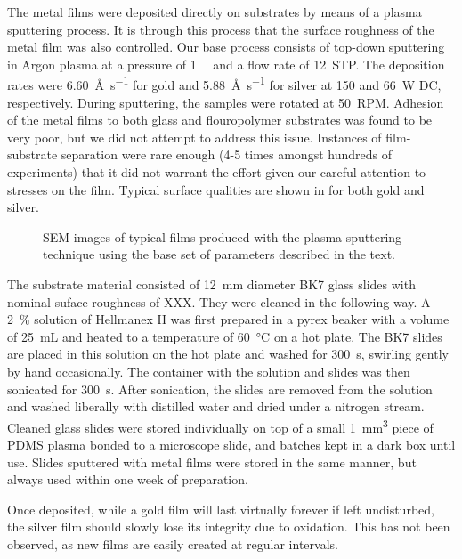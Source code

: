 The metal films were deposited directly on substrates by means of a plasma
sputtering process.  It is through this process that the surface roughness
of the metal film was also controlled.  Our base process consists of
top-down sputtering in Argon plasma at a pressure of \SI{1}{\milli\torr}
and a flow rate of \SI{12}{STP}.  The deposition rates were
\SI{6.60}{\angstrom\per\second} for gold and
\SI{5.88}{\angstrom\per\second} for silver at 150 and \SI{66}{\watt} DC,
respectively.  During sputtering, the samples were rotated at \SI{50}{RPM}.
Adhesion of the metal films to both glass and flouropolymer substrates was
found to be very poor, but we did not attempt to address this issue.
Instances of film-substrate separation were rare enough (4-5 times amongst
hundreds of experiments) that it did not warrant the effort given our
careful attention to stresses on the film.  Typical surface qualities are
shown in  for both gold and silver.  
\begin{figure}
\centering
\ersatzfigure
\caption{SEM images of typical films produced with the plasma sputtering
technique using the base set of parameters described in the text.}
\label{fig:semsputter}
\end{figure}

The substrate material consisted of \SI{12}{\milli\meter} diameter BK7
glass slides with nominal suface roughness of XXX.  They were cleaned in
the following way.  A \SI{2}{\percent} solution of Hellmanex II was first
prepared in a pyrex beaker with a volume of \SI{25}{\milli\liter} and
heated to a temperature of \SI{60}{\celsius} on a hot plate.  The BK7
slides are placed in this solution on the hot plate and washed for
\SI{300}{\second}, swirling gently by hand occasionally.  The container
with the solution and slides was then sonicated for \SI{300}{\second}.
After sonication, the slides are removed from the solution and washed
liberally with distilled water and dried under a nitrogen stream.  Cleaned
glass slides were stored individually on top of a small
\SI{1}{\milli\meter\cubed} piece of PDMS plasma bonded to a microscope
slide, and batches kept in a dark box until use.  Slides sputtered with
metal films were stored in the same manner, but always used within one week
of preparation.

Once deposited, while a gold film will last virtually forever if left
undisturbed, the silver film should slowly lose its integrity due to
oxidation.  This has not been observed, as new films are easily created at
regular intervals.  

